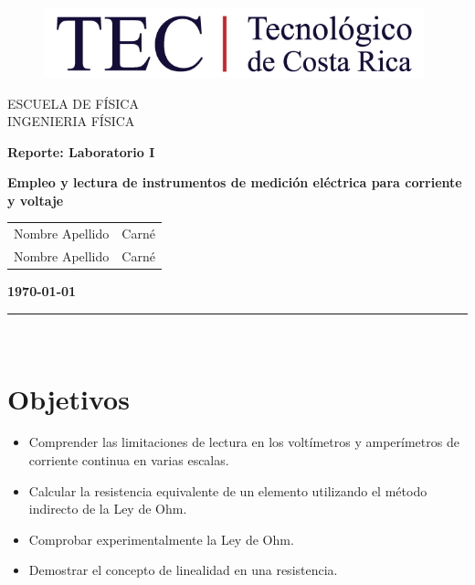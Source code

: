 \documentclass[12pt,letterpaper]{article}
\newcommand{\obj}{Objetivos}
\begin{document}
\begin{titlepage}

\begin{center}
\vspace*{-0.5in}
\begin{figure}[htb]
\begin{center}
\includegraphics[width=11cm]{fig/logo.png}
\end{center}
\end{figure}
\vspace*{0.4in}
\begin{Large}
ESCUELA DE FÍSICA\\
\vspace*{0.15in}
INGENIERIA FÍSICA\\
\vspace*{0.8in}
\end{Large}
\vspace*{0.2in}
\begin{Large}
\textbf{Reporte: Laboratorio I} \\
\end{Large}
\textbf{Empleo y lectura de instrumentos de medición eléctrica para corriente y voltaje}
\vspace*{0.3in}\\
\begin{center}
    \begin{tabular}{c|c}
        Nombre Apellido & Carné  \\
        Nombre Apellido & Carné
    \end{tabular}
\end{center}
\vspace*{2.5in}
\begin{Large}
\textbf{\today}\\
\end{Large}
\rule{80mm}{0.1mm}\\
\vspace*{0.1in}
\end{center}

\end{titlepage}

\tableofcontents
\newpage

\section{\obj}
\begin{itemize}
\item Comprender las limitaciones de lectura en los voltímetros y amperímetros de corriente continua en varias escalas.
\item Calcular la resistencia equivalente de un elemento utilizando el método indirecto de la Ley de Ohm.
\item	Comprobar experimentalmente la Ley de Ohm.
\item	Demostrar el concepto de linealidad en una resistencia.
\end{itemize}
\end{document}

